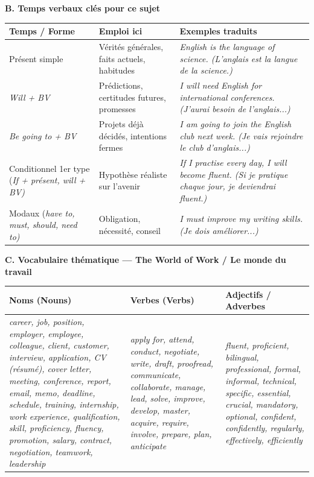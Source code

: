 \documentclass[11pt]{article}
\newcommand{\eng}[1]{\ifmmode\text{\textit{#1}}\else\begingroup\selectlanguage{english}\itshape #1\endgroup\fi}
\begin{document}
\begin{aretenir}
\textbf{B. Temps verbaux clés pour ce sujet}
\begin{center}
\begin{tabular}{|l|l|l|}
\hline
\rowcolor{popblueL} \textbf{Temps / Forme} & \textbf{Emploi ici} & \textbf{Exemples traduits} \\
\hline
Présent simple & Vérités générales, faits actuels, habitudes & \eng{English is the language of science.} (L'anglais est la langue de la science.) \\
\hline
\eng{Will} + BV & Prédictions, certitudes futures, promesses & \eng{I will need English for international conferences.} (J'aurai besoin de l'anglais...) \\
\hline
\eng{Be going to} + BV & Projets déjà décidés, intentions fermes & \eng{I am going to join the English club next week.} (Je vais rejoindre le club d'anglais...) \\
\hline
Conditionnel 1er type (\eng{If} + présent, \eng{will} + BV) & Hypothèse réaliste sur l'avenir & \eng{If I practise every day, I will become fluent.} (Si je pratique chaque jour, je deviendrai fluent.) \\
\hline
Modaux (\eng{have to, must, should, need to}) & Obligation, nécessité, conseil & \eng{I must improve my writing skills.} (Je dois améliorer...) \\
\hline
\end{tabular}
\end{center}

\textbf{C. Vocabulaire thématique — The World of Work / Le monde du travail}
\begin{center}
\begin{tabularx}{\linewidth}{|X|X|X|}
\hline
\rowcolor{popblueL} \textbf{Noms (Nouns)} & \textbf{Verbes (Verbs)} & \textbf{Adjectifs / Adverbes} \\
\hline
\eng{career, job, position, employer, employee, colleague, client, customer, interview, application, CV (résumé), cover letter, meeting, conference, report, email, memo, deadline, schedule, training, internship, work experience, qualification, skill, proficiency, fluency, promotion, salary, contract, negotiation, teamwork, leadership} & \eng{apply for, attend, conduct, negotiate, write, draft, proofread, communicate, collaborate, manage, lead, solve, improve, develop, master, acquire, require, involve, prepare, plan, anticipate} & \eng{fluent, proficient, bilingual, professional, formal, informal, technical, specific, essential, crucial, mandatory, optional, confident, confidently, regularly, effectively, efficiently} \\
\hline
\end{tabularx}
\end{center}
\end{aretenir}
\end{document}
